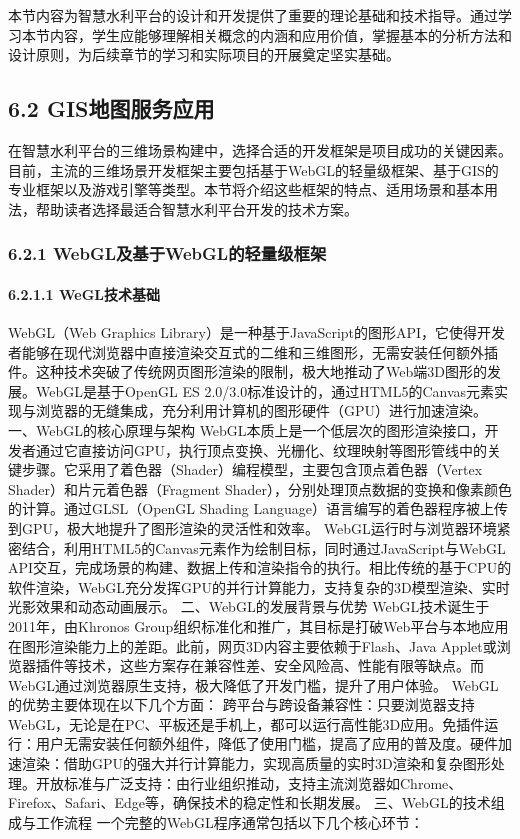 本节内容为智慧水利平台的设计和开发提供了重要的理论基础和技术指导。通过学习本节内容，学生应能够理解相关概念的内涵和应用价值，掌握基本的分析方法和设计原则，为后续章节的学习和实际项目的开展奠定坚实基础。

\subsection{6.2 GIS地图服务应用}\label{gisux5730ux56feux670dux52a1ux5e94ux7528} 在智慧水利平台的三维场景构建中，选择合适的开发框架是项目成功的关键因素。目前，主流的三维场景开发框架主要包括基于WebGL的轻量级框架、基于GIS的专业框架以及游戏引擎等类型。本节将介绍这些框架的特点、适用场景和基本用法，帮助读者选择最适合智慧水利平台开发的技术方案。 \subsubsection{6.2.1 WebGL及基于WebGL的轻量级框架}\label{webglux53caux57faux4e8ewebglux7684ux8f7bux91cfux7ea7ux6846ux67b6} \paragraph{6.2.1.1 WeGL技术基础}\label{weglux6280ux672fux57faux7840} WebGL（Web Graphics Library）是一种基于JavaScript的图形API，它使得开发者能够在现代浏览器中直接渲染交互式的二维和三维图形，无需安装任何额外插件。这种技术突破了传统网页图形渲染的限制，极大地推动了Web端3D图形的发展。WebGL是基于OpenGL ES 2.0/3.0标准设计的，通过HTML5的Canvas元素实现与浏览器的无缝集成，充分利用计算机的图形硬件（GPU）进行加速渲染。 一、WebGL的核心原理与架构 WebGL本质上是一个低层次的图形渲染接口，开发者通过它直接访问GPU，执行顶点变换、光栅化、纹理映射等图形管线中的关键步骤。它采用了着色器（Shader）编程模型，主要包含顶点着色器（Vertex Shader）和片元着色器（Fragment Shader），分别处理顶点数据的变换和像素颜色的计算。通过GLSL（OpenGL Shading Language）语言编写的着色器程序被上传到GPU，极大地提升了图形渲染的灵活性和效率。 WebGL运行时与浏览器环境紧密结合，利用HTML5的Canvas元素作为绘制目标，同时通过JavaScript与WebGL API交互，完成场景的构建、数据上传和渲染指令的执行。相比传统的基于CPU的软件渲染，WebGL充分发挥GPU的并行计算能力，支持复杂的3D模型渲染、实时光影效果和动态动画展示。 二、WebGL的发展背景与优势 WebGL技术诞生于2011年，由Khronos Group组织标准化和推广，其目标是打破Web平台与本地应用在图形渲染能力上的差距。此前，网页3D内容主要依赖于Flash、Java Applet或浏览器插件等技术，这些方案存在兼容性差、安全风险高、性能有限等缺点。而WebGL通过浏览器原生支持，极大降低了开发门槛，提升了用户体验。 WebGL的优势主要体现在以下几个方面： 跨平台与跨设备兼容性：只要浏览器支持WebGL，无论是在PC、平板还是手机上，都可以运行高性能3D应用。免插件运行：用户无需安装任何额外组件，降低了使用门槛，提高了应用的普及度。硬件加速渲染：借助GPU的强大并行计算能力，实现高质量的实时3D渲染和复杂图形处理。开放标准与广泛支持：由行业组织推动，支持主流浏览器如Chrome、Firefox、Safari、Edge等，确保技术的稳定性和长期发展。 三、WebGL的技术组成与工作流程 一个完整的WebGL程序通常包括以下几个核心环节： 